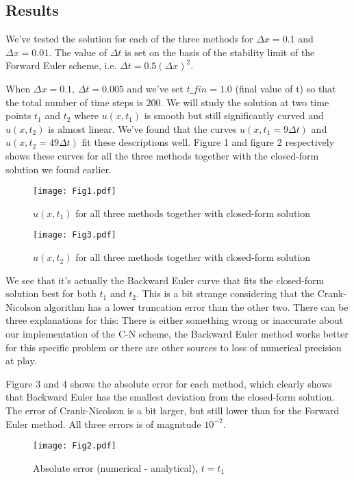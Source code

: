 \documentclass[a4paper,12pt, english]{article}
\begin{document}
\subsection*{Results}

We've tested the solution for each of the three methods for $\Delta x = 0.1$ and $\Delta x = 0.01$. The value of $\Delta t$ is set on the basis of the stability limit of the Forward Euler scheme, i.e. $\Delta t = 0.5 (\Delta x)^2$.

When $\Delta x = 0.1$, $\Delta t = 0.005$ and we've set $t\_ fin = 1.0$ (final value of t) so that the total number of time steps is $200$. We will study the solution at two time points $t_1$ and $t_2$ where $u(x,t_1)$ is smooth but still significantly curved and $u(x,t_2)$ is almost linear. We've found that the curves $u(x,t_1 = 9\Delta t)$ and $u(x,t_2 = 49\Delta t)$ fit these descriptions well. Figure 1 and figure 2 respectively shows these curves for all the three methods together with the closed-form solution we found earlier.

\begin{figure}[!h]
\centering
\texttt{[image: Fig1.pdf]}
\caption{$u(x,t_1)$ for all three methods together with closed-form solution}
\end{figure} 

\begin{figure}[!h]
\centering
\texttt{[image: Fig3.pdf]}
\caption{$u(x,t_2)$ for all three methods together with closed-form solution}
\end{figure} 

We see that it's actually the Backward Euler curve that fits the closed-form solution best for both $t_1$ and $t_2$. This is a bit strange considering that the Crank-Nicolson algorithm has a lower truncation error than the other two. There can be three explanations for this: There is either something wrong or inaccurate about our implementation of the C-N scheme, the Backward Euler method works better for this specific problem or there are other sources to loss of numerical precision at play. 

Figure 3 and 4 shows the absolute error for each method, which clearly shows that Backward Euler has the smallest deviation from the closed-form solution. The error of Crank-Nicolson is a bit larger, but still lower than for the Forward Euler method. All three errors is of magnitude $10^{-2}$. 

\begin{figure}[!h]
\centering
\texttt{[image: Fig2.pdf]}
\caption{Absolute error (numerical - analytical), $t = t_1$}
\end{figure} 
\end{document}
